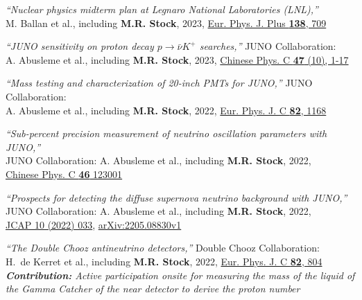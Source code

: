 \documentclass[letterpaper,12pt, oneside]{article}
\begin{document}
\begin{etaremune}[leftmargin=1.65em]
\item \textit{“Nuclear physics midterm plan at Legnaro National Laboratories (LNL),”} \\ M. Ballan et al., including \textbf{M.R. Stock}, 2023,   \href{https://doi.org/10.1140/epjp/s13360-023-04249-x}{Eur. Phys. J. Plus \textbf{138}, 709}

\item \textit{“JUNO sensitivity on proton decay $p \rightarrow \bar{\nu} K^+$ searches,”} JUNO Collaboration: \\ A. Abusleme et al., including \textbf{M.R. Stock}, 2023, \href{http://hepnp.ihep.ac.cn/article/id/bcbe9b7d-149c-4146-a08a-8ee6a3949734}{Chinese Phys. C \textbf{47} (10), 1-17}

\item \textit{“Mass testing and characterization of 20-inch PMTs for JUNO,”} JUNO Collaboration: \\ A. Abusleme et al., including \textbf{M.R. Stock}, 2022, \href{https://doi.org/10.1140/epjc/s10052-022-11002-8}{Eur. Phys. J. C \textbf{82}, 1168}

\item \textit{“Sub-percent precision measurement of neutrino oscillation parameters with JUNO,”} \\ JUNO Collaboration: A. Abusleme et al., including \textbf{M.R. Stock}, 2022, \\ \href{http://dx.doi.org/10.1088/1674-1137/ac8bc9}{Chinese Phys. C \textbf{46} 123001}

\item \textit{“Prospects for detecting the diffuse supernova neutrino background with JUNO,”} \\ JUNO Collaboration: A. Abusleme et al., including \textbf{M.R. Stock}, 2022,\\
\href{https://doi.org/10.1088/1475-7516/2022/10/033}{JCAP 10 (2022) 033}, \href{https://doi.org/10.48550/arXiv.2205.08830}{arXiv:2205.08830v1}

\item \textit{“The Double Chooz antineutrino detectors,”} Double Chooz Collaboration:\\ H.~de Kerret et al., including \textbf{M.R. Stock}, 2022, \href{https://doi.org/10.1140/epjc/s10052-022-10726-x}{Eur. Phys. J. C \textbf{82}, 804}\\ \textit{\textbf{Contribution:} Active participation onsite for measuring the mass of the liquid of the Gamma Catcher of the near detector to derive the proton number}


\end{etaremune}
\end{document}

